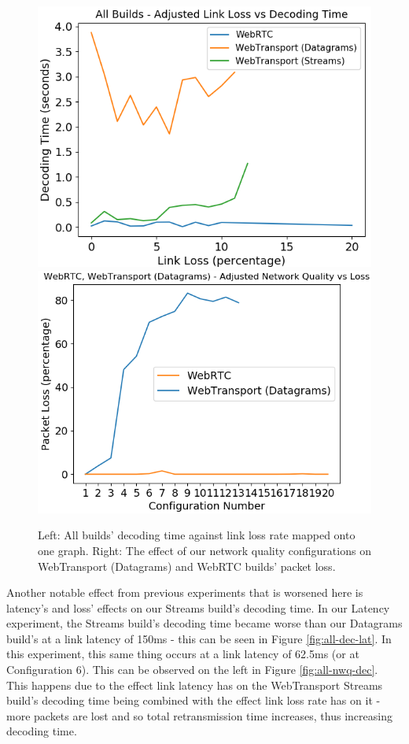 \begin{figure}[h]
    \centering
    \includegraphics[width=0.49\linewidth]{images/loss/all-loss-decode.png}
    \includegraphics[width=0.49\linewidth]{images/combo/dg-nwq-loss.png}
    \caption{Left: All builds' decoding time against link loss rate mapped onto one graph. Right: The effect of our network quality configurations on WebTransport (Datagrams) and WebRTC builds' packet loss.}
    \label{fig:dg-nwq-loss} 
\end{figure}

Another notable effect from previous experiments that is worsened here is latency's and loss' effects on our Streams build's decoding time. In our Latency experiment, the Streams build's decoding time became worse than our Datagrams build's at a link latency of 150ms - this can be seen in Figure \ref{fig:all-dec-lat}. In this experiment, this same thing occurs at a link latency of 62.5ms (or at Configuration 6). This can be observed on the left in Figure \ref{fig:all-nwq-dec}. This happens due to the effect link latency has on the WebTransport Streams build's decoding time being combined with the effect link loss rate has on it - more packets are lost and so total retransmission time increases, thus increasing decoding time.

